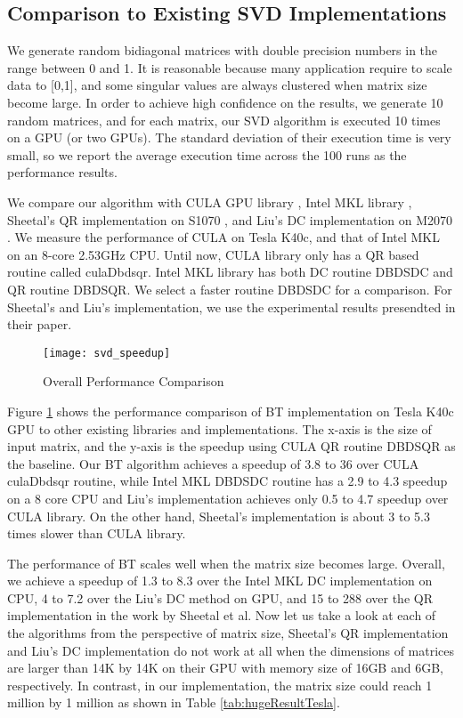 \subsection{Comparison to Existing SVD Implementations}
We generate random bidiagonal matrices with double precision numbers in the range between 0 and 1.
{\color{red} It is reasonable because many application require to scale data to [0,1], and some singular values are always clustered when matrix size become large.}
In order to achieve high confidence on the results, we generate 10 random matrices, and for each matrix, our SVD algorithm is executed 10 times on a GPU (or two GPUs).
The standard deviation of their execution time is very small, so we report the average execution time across the 100 runs as the performance results.

We compare our algorithm with CULA GPU library \cite{cula}, Intel MKL library \cite{mkl}, Sheetal's QR implementation on S1070 \cite{09IPDPSQR}, and Liu's DC implementation on M2070 \cite{13CFDC}.
We measure the performance of CULA on Tesla K40c, and that of Intel MKL on an 8-core 2.53GHz CPU.
Until now, CULA library only has a QR based routine called culaDbdsqr.
Intel MKL library has both DC routine DBDSDC and QR routine DBDSQR. We select a faster routine DBDSDC for a comparison.
For Sheetal's \cite{09IPDPSQR} and Liu's \cite{13CFDC} implementation, we use the experimental results presendted in their paper. 

\begin{figure}[hbpt]
\vspace{-0.3in}
\centering
\texttt{[image: svd\_speedup]}
\vspace{-0.1in}
\caption{Overall Performance Comparison}
\label{fig:svd_speedup}
\vspace{-0.3in}
\end{figure}
Figure \ref{fig:svd_speedup} shows the performance comparison of BT
implementation on Tesla K40c GPU to other existing libraries
and implementations.
The x-axis is the size of input matrix, and the y-axis is the speedup
using CULA QR routine DBDSQR as the baseline.
Our BT algorithm achieves a speedup of 3.8 to 36 over CULA culaDbdsqr routine,
while Intel MKL DBDSDC routine has a 2.9 to 4.3 speedup on a 8 core CPU and Liu's implementation achieves only 0.5 to 4.7 speedup over CULA library.
On the other hand, Sheetal's implementation is about 3 to 5.3 times slower than CULA library.

The performance of BT scales well when the matrix size becomes large.
Overall, we achieve a speedup of 1.3 to 8.3 over the Intel MKL
DC implementation on CPU, 4 to 7.2 over the Liu's
DC method on GPU, and 15 to 288 over the QR implementation in the work by Sheetal et al.
Now let us take a look at each of the algorithms from the perspective of matrix size, Sheetal's QR implementation and Liu's DC implementation do not work at all when the dimensions of matrices are larger than 14K by 14K on their GPU with memory size of 16GB and 6GB, respectively. In contrast, in our implementation, the matrix size could reach 1 million by 1 million as shown in Table \ref{tab:hugeResultTesla}.

